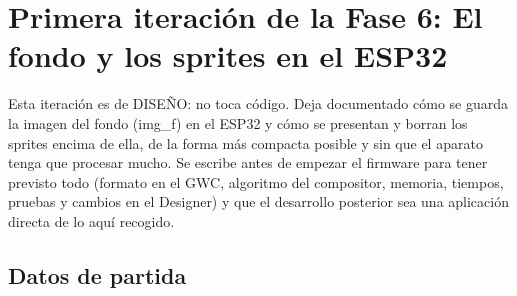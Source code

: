 \section{Primera iteración de la Fase 6: El fondo y los sprites en el ESP32}
\label{sec:F6I01}

Esta iteración es de DISEÑO: no toca código. Deja documentado cómo se guarda la imagen del fondo (img\_f) en el ESP32 y cómo se presentan y borran los sprites encima de ella, de la forma más compacta posible y sin que el aparato tenga que procesar mucho. Se escribe antes de empezar el firmware para tener previsto todo (formato en el GWC, algoritmo del compositor, memoria, tiempos, pruebas y cambios en el Designer) y que el desarrollo posterior sea una aplicación directa de lo aquí recogido.

\subsection{Datos de partida}
\label{sec:F6I01Datos}

